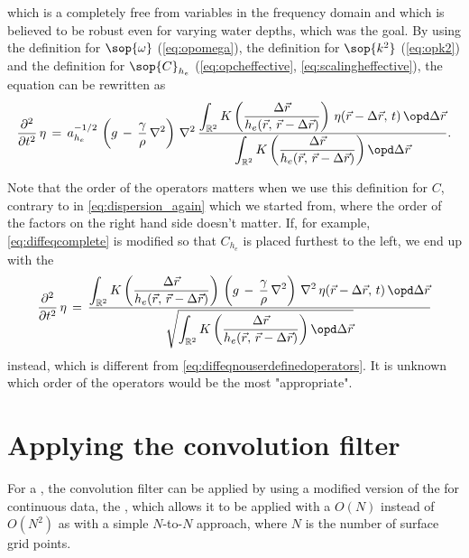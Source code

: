 %
which is a \PDE completely free from variables in the frequency domain and which is believed to be robust even for varying water depths, which was the goal. By using the definition for $\sop{\omega}$ (\eqref{eq:opomega}), the definition for $\sop{k^2}$ (\eqref{eq:opk2}) and the definition for $\sop{C}_{h_e}$ (\eqref{eq:opcheffective}, \eqref{eq:scalingheffective}), the equation can be rewritten as
%
\begin{equation} \label{eq:diffeqnouserdefinedoperators}
\frac{\partial^2}{\partial t^2}\,\eta \,=\, a_{h_e}^{-1/2}\,\left(g\,-\,\frac{\gamma}{\rho}\,\nabla^2\right)\,\nabla^2\,\frac{\displaystyle\int_{\mathbb{R}^2}K\left(\frac{\Delta\vec{r}}{h_e(\vec{r},\,\vec{r}-\Delta\vec{r})}\right)\,\eta(\vec{r}-\Delta\vec{r},\,t)\,\opd\Delta\vec{r}}{\displaystyle\int_{\mathbb{R}^2}K\left(\frac{\Delta\vec{r}}{h_e(\vec{r},\,\vec{r}-\Delta\vec{r})}\right) \opd\Delta\vec{r}}.
\end{equation}

Note that the order of the operators matters when we use this definition for $C$, contrary to in \eqref{eq:dispersion_again} which we started from, where the order of the factors on the right hand side doesn't matter. If, for example, \eqref{eq:diffeqcomplete} is modified so that $C_{h_e}$ is placed furthest to the left, we end up with the \PDE
%
\begin{equation} \label{eq:diffeqnouserdefinedoperatorsvariant}
\frac{\partial^2}{\partial t^2}\,\eta \,=\, \frac{\displaystyle\int_{\mathbb{R}^2}K\left(\frac{\Delta\vec{r}}{h_e(\vec{r},\,\vec{r}-\Delta\vec{r})}\right)\,\left(g\,-\,\frac{\gamma}{\rho}\,\nabla^2\right)\,\nabla^2\,\eta(\vec{r}-\Delta\vec{r},\,t)\,\opd\Delta\vec{r}}{\sqrt{\displaystyle\int_{\mathbb{R}^2}K\left(\frac{\Delta\vec{r}}{h_e(\vec{r},\,\vec{r}-\Delta\vec{r})}\right) \opd\Delta\vec{r}}}
\end{equation}
%
instead, which is different from \eqref{eq:diffeqnouserdefinedoperators}. It is unknown which order of the operators would be the most "appropriate".

\section{Applying the convolution filter}

For a , the convolution filter can be applied by using a modified version of the \FMM{} \citep{Greengard1985,Greengard1987a} for continuous data, the \CFMM{} \citep{White1994}, which allows it to be applied with a $O(N)$  instead of $O(N^2)$ as with a simple $N$-to-$N$ approach, where $N$ is the number of surface grid points.

